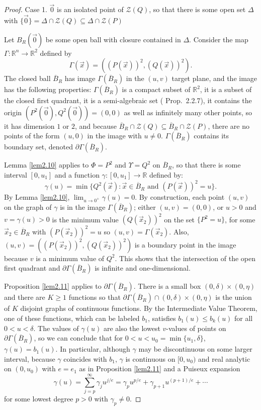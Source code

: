 \documentclass[12pt]{amsart}
\theoremstyle{definition}
\theoremstyle{remark}
\numberwithin{equation}{section}
\newcommand{\re}{\mathbb{R}}
\newcommand{\vv}{\mathcal{Z}}
\begin{document}
\begin{proof}
  Case 1.  $\vec 0$ is an isolated point of $\vv(Q)$, so that there is some open set $\Delta$ with $\{\vec0\}=\Delta\cap\vv(Q)\subseteq\Delta\cap\vv(P)$

  Let $B_R(\vec0)$ be some open ball with closure contained in $\Delta$.
    Consider the map $\Gamma:\re^n\to\re^{2}$ defined by $$\Gamma(\vec x)=((P(\vec x))^2,(Q(\vec x))^2).$$     The closed ball ${\overline B}_R$ has image $\Gamma({\overline B}_R)$ in the $(u,v)$ target plane, and the image has the following properties: $\Gamma({\overline B}_R)$ is a compact subset of $\re^2$, it is a subset of the closed first quadrant, it is a semi-algebraic set (\cite{bcr} Prop.\ 2.2.7), it contains the origin $(P^2(\vec0),Q^2(\vec0))=(0,0)$ as well as infinitely many other points, so it has dimension $1$ or $2$, and because ${\overline B}_R\cap\vv(Q)\subseteq{\overline B}_R\cap\vv(P)$, there are no points of the form $(u,0)$ in the image with $u\ne0$.  
    $\Gamma({\overline B}_R)$ contains its boundary set, denoted $\partial\Gamma({\overline B}_R)$.

  Lemma \ref{lem2.10} applies to $\Phi=P^2$ and $\Upsilon=Q^2$ on ${\overline B}_R$, so that there is some interval $[0,u_1]$ and a function $\gamma:[0,u_1]\to\re$ defined by: \begin{equation}\label{eq10}
      \gamma(u)=\min\{Q^2(\vec x):\vec x\in{\overline B}_R\mbox{\ and\ }(P(\vec x))^2=u\}.
    \end{equation}
    By Lemma \ref{lem2.10}, $\displaystyle{\lim_{u\to0^+}\gamma(u)=0}$.  By construction, each point $(u,v)$ on the graph of $\gamma$ is in the image $\Gamma({\overline B}_R)$; either $(u,v)=(0,0)$, or $u>0$ and $v=\gamma(u)>0$ is the minimum value $(Q(\vec x_2))^2$ on the set $\{P^2=u\}$, for some $\vec x_2\in{\overline B}_R$ with $(P(\vec x_2))^2=u$ so $(u,v)=\Gamma(\vec x_2)$.  Also, $(u,v)=((P(\vec x_2))^2,(Q(\vec x_2))^2)$ is a boundary point in the image because $v$ is a minimum value of $Q^2$.  This shows that the intersection of the open first quadrant and $\partial\Gamma({\overline B}_R)$ is infinite and one-dimensional.

    Proposition \ref{lem2.11} applies to $\partial\Gamma({\overline B}_R)$.  There is a small box $(0,\delta)\times(0,\eta)$ and there are $K\ge1$ functions so that $\partial\Gamma({\overline B}_R)\cap(0,\delta)\times(0,\eta)$ is the union of $K$ disjoint graphs of continuous functions.  By the Intermediate Value Theorem, one of these functions, which can be labeled $b_1$, satisfies $b_1(u)\le b_k(u)$ for all $0<u<\delta$.  The values of $\gamma(u)$ are also the lowest $v$-values of points on $\partial\Gamma({\overline B}_R)$, so we can conclude that for $0<u<u_0=\min\{u_1,\delta\}$, $\gamma(u)=b_1(u)$.  In particular, although $\gamma$ may be discontinuous on some larger interval, because $\gamma$ coincides with $b_1$, $\gamma$ is continuous on $[0,u_0)$ and real analytic on $(0,u_0)$ with $e=e_1$ as in Proposition \ref{lem2.11} and a Puiseux expansion $$\gamma(u)=\sum_{j=p}^{\infty}\gamma_ju^{j/e}=\gamma_pu^{p/e}+\gamma_{p+1}u^{(p+1)/e}+\cdots$$ for some lowest degree $p>0$ with $\gamma_p\ne0$.


\end{proof}
\end{document}
